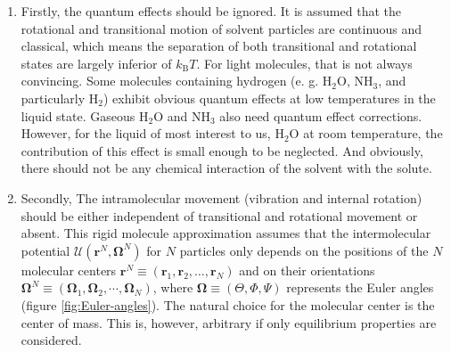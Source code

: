\begin{enumerate}
\item Firstly, the quantum effects should be ignored. It is assumed that
the rotational and transitional motion of solvent particles are continuous
and classical, which means the separation of both transitional and
rotational states are largely inferior of $k_{\mathrm{B}}T$. For
light molecules, that is not always convincing. Some molecules containing
hydrogen (e. g. $\mathrm{H_{2}O}$, $\mathrm{NH_{3}}$, and particularly
$\mathrm{H_{2}}$) exhibit obvious quantum effects at low temperatures
in the liquid state. Gaseous $\mathrm{H_{2}O}$ and $\mathrm{NH_{3}}$
also need quantum effect corrections. However, for the liquid of most
interest to us, $\mathrm{H_{2}O}$ at room temperature, the contribution
of this effect is small enough to be neglected. And obviously, there
should not be any chemical interaction of the solvent with the solute.
\item Secondly, The intramolecular movement (vibration and internal rotation) should
be either independent of transitional and rotational movement or absent.
This rigid molecule approximation assumes that the intermolecular
potential $\mathcal{U}(\mathbf{r}^{N},\mathbf{\Omega}^{N})$ for $N$
particles only depends on the positions of the $N$ molecular centers
$\mathbf{r}^{N}\equiv(\mathbf{r}_{1},\mathbf{r}_{2},\ldots,\mathbf{r}_{N})$
and on their orientations $\mathbf{\Omega}^{N}\equiv(\mathbf{\Omega}_{1},\mathbf{\Omega}_{2},\cdots,\mathbf{\Omega}_{N})$,
where $\mathbf{\Omega}\equiv(\Theta,\Phi,\Psi)$ represents the Euler
angles (figure \ref{fig:Euler-angles}). The natural choice for the
molecular center is the center of mass. This is, however, arbitrary
if only equilibrium properties are considered.


\end{enumerate}
